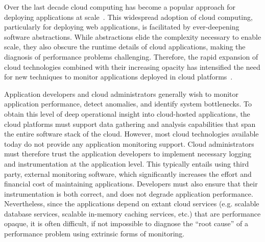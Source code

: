 Over the last decade cloud computing has become a popular approach for deploying
applications at scale~\cite{Antonopoulos:2010:CCP:1855007,Pinheiro:2014:ACC:2618168.2618188}. 
This widespread adoption of cloud computing, particularly for deploying
web applications, is facilitated by ever-deepening software abstractions.
While abstractions elide the complexity necessary to enable scale,
they also obscure the runtime details of cloud applications, 
making the diagnosis of performance problems challenging.
Therefore, the rapid expansion of cloud technologies
combined with their increasing opacity has intensified the need 
for new techniques to
monitor applications deployed in cloud platforms~\cite{DaCunhaRodrigues:2016:MCC:2851613.2851619}. 

Application developers and cloud administrators generally wish to monitor 
application performance, detect anomalies, and identify system bottlenecks. To obtain 
this level of deep operational insight into cloud-hosted applications, the cloud platforms must support 
data gathering and analysis capabilities that span the entire software stack of the cloud. 
However, most cloud technologies available
today do not provide any application monitoring support. Cloud administrators must therefore trust the
application developers to implement necessary logging and instrumentation 
at the application level. This typically entails using third party, external monitoring software,
which significantly increases the effort and financial cost of maintaining applications.
Developers must also ensure
that their instrumentation is both correct, and does not degrade 
application performance.  Nevertheless, since the applications depend on extant
cloud services (e.g. scalable database services, 
scalable in-memory caching services, etc.) that are performance opaque, it is
often difficult, if not impossible to diagnose the ``root cause'' of a performance problem
using extrinsic forms of monitoring.

